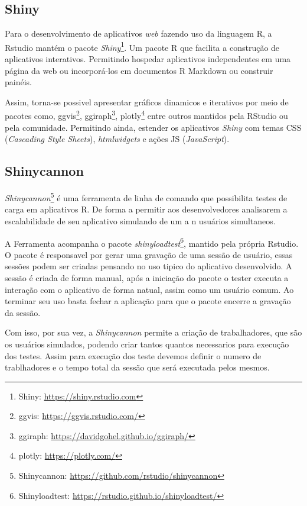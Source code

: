 \documentclass[12pt,english,brazil]{article}
\begin{document}
\subsection{Shiny} \label{sec:Shiny}

Para o desenvolvimento de aplicativos \emph{web} fazendo uso da linguagem R, a Rstudio mantém o pacote \emph{Shiny}\footnote{Shiny: \url{https://shiny.rstudio.com}}. Um pacote R que facilita a construção de aplicativos interativos. Permitindo hospedar aplicativos independentes em uma página da web ou incorporá-los em documentos R Markdown ou construir painéis. 

Assim, torna-se possivel apresentar gráficos dinamicos e iterativos por meio de pacotes como, ggvis\footnote{ggvis: \url{https://ggvis.rstudio.com/}}, ggiraph\footnote{ggiraph: \url{https://davidgohel.github.io/ggiraph/}}, plotly\footnote{plotly: \url{https://plotly.com/}} entre outros mantidos pela RStudio ou pela comunidade. Permitindo ainda, estender os aplicativos \emph{Shiny} com temas CSS (\emph{Cascading Style Sheets}), \emph{htmlwidgets} e ações JS (\emph{JavaScript}).

\subsection{Shinycannon} \label{sec:Shinycannon}

\textit{Shinycannon}\footnote{Shinycannon: \url{https://github.com/rstudio/shinycannon}} é uma ferramenta de linha de comando que possibilita testes de carga em aplicativos R. De forma a permitir aos desenvolvedores analisarem a escalabilidade de seu aplicativo simulando de um a n usuários simultaneos.

A Ferramenta acompanha o pacote \textit{shinyloadtest}\footnote{Shinyloadtest: \url{https://rstudio.github.io/shinyloadtest/}}, mantido pela própria Rstudio. O pacote é responsavel por gerar uma gravação de uma sessão de usuário, essas sessões podem ser criadas pensando no uso tipico do aplicativo desenvolvido\cite{shinyloadtest}. A sessão é criada de forma manual, após a iniciação do pacote o tester executa a interação com o aplicativo de forma natual, assim como um usuário comum. Ao terminar seu uso basta fechar a aplicação para que o pacote encerre a gravação da sessão.

Com isso, por sua vez, a \textit{Shinycannon} permite a criação de trabalhadores, que são os usuários simulados, podendo criar tantos quantos necessarios para execução dos testes. Assim para execução dos teste devemos definir o numero de trablhadores e o tempo total da sessão que será executada pelos mesmos. 
\end{document}
